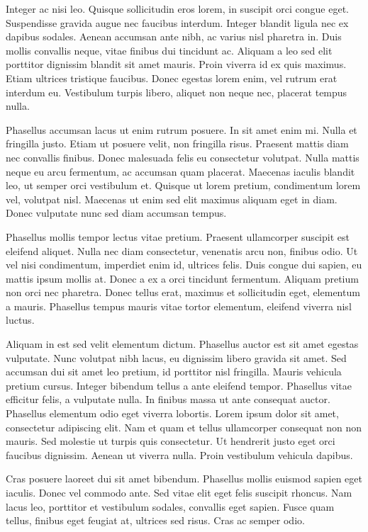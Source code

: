 Integer ac nisi leo. Quisque sollicitudin eros lorem, in suscipit orci congue eget. Suspendisse gravida augue nec faucibus interdum. Integer blandit ligula nec ex dapibus sodales. Aenean accumsan ante nibh, ac varius nisl pharetra in. Duis mollis convallis neque, vitae finibus dui tincidunt ac. Aliquam a leo sed elit porttitor dignissim blandit sit amet mauris. Proin viverra id ex quis maximus. Etiam ultrices tristique faucibus. Donec egestas lorem enim, vel rutrum erat interdum eu. Vestibulum turpis libero, aliquet non neque nec, placerat tempus nulla.

Phasellus accumsan lacus ut enim rutrum posuere. In sit amet enim mi. Nulla et fringilla justo. Etiam ut posuere velit, non fringilla risus. Praesent mattis diam nec convallis finibus. Donec malesuada felis eu consectetur volutpat. Nulla mattis neque eu arcu fermentum, ac accumsan quam placerat. Maecenas iaculis blandit leo, ut semper orci vestibulum et. Quisque ut lorem pretium, condimentum lorem vel, volutpat nisl. Maecenas ut enim sed elit maximus aliquam eget in diam. Donec vulputate nunc sed diam accumsan tempus.

Phasellus mollis tempor lectus vitae pretium. Praesent ullamcorper suscipit est eleifend aliquet. Nulla nec diam consectetur, venenatis arcu non, finibus odio. Ut vel nisi condimentum, imperdiet enim id, ultrices felis. Duis congue dui sapien, eu mattis ipsum mollis at. Donec a ex a orci tincidunt fermentum. Aliquam pretium non orci nec pharetra. Donec tellus erat, maximus et sollicitudin eget, elementum a mauris. Phasellus tempus mauris vitae tortor elementum, eleifend viverra nisl luctus.

Aliquam in est sed velit elementum dictum. Phasellus auctor est sit amet egestas vulputate. Nunc volutpat nibh lacus, eu dignissim libero gravida sit amet. Sed accumsan dui sit amet leo pretium, id porttitor nisl fringilla. Mauris vehicula pretium cursus. Integer bibendum tellus a ante eleifend tempor. Phasellus vitae efficitur felis, a vulputate nulla. In finibus massa ut ante consequat auctor. Phasellus elementum odio eget viverra lobortis. Lorem ipsum dolor sit amet, consectetur adipiscing elit. Nam et quam et tellus ullamcorper consequat non non mauris. Sed molestie ut turpis quis consectetur. Ut hendrerit justo eget orci faucibus dignissim. Aenean ut viverra nulla. Proin vestibulum vehicula dapibus.

Cras posuere laoreet dui sit amet bibendum. Phasellus mollis euismod sapien eget iaculis. Donec vel commodo ante. Sed vitae elit eget felis suscipit rhoncus. Nam lacus leo, porttitor et vestibulum sodales, convallis eget sapien. Fusce quam tellus, finibus eget feugiat at, ultrices sed risus. Cras ac semper odio.

